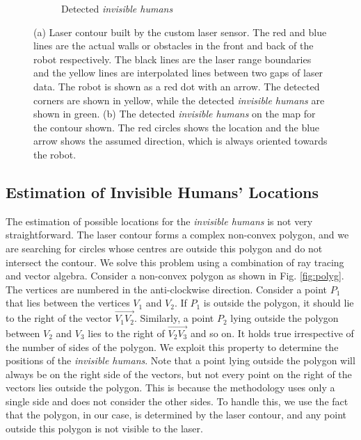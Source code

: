 \begin{figure}[h!]
\begin{subfigure}[t]{0.45\columnwidth}
  \caption{Detected \textit{invisible humans}}
\end{subfigure}
    \caption{(a) Laser contour built by the custom laser sensor. The red and blue lines are the actual walls or obstacles in the front and back of the robot respectively. The black lines are the laser range boundaries and the yellow lines are interpolated lines between two gaps of laser data. The robot is shown as a red dot with an arrow. The detected corners are shown in yellow, while the detected \textit{invisible humans} are shown in green. (b) The detected \textit{invisible humans} on the map for the contour shown. The red circles shows the location and the blue arrow shows the assumed direction, which is always oriented towards the robot.}
    \label{fig:detection}
\end{figure}

\subsection{Estimation of Invisible Humans’ Locations}
The estimation of possible locations for the \textit{invisible humans} is not very straightforward. The laser contour forms a complex non-convex polygon, and we are searching for circles whose centres are outside this polygon and do not intersect the contour. We solve this problem using a combination of ray tracing and vector algebra. Consider a non-convex polygon as shown in Fig. \ref{fig:polyg}. The vertices are numbered in the anti-clockwise direction. Consider a point $P_1$ that lies between the vertices $V_1$ and $V_2$. If $P_1$ is outside the polygon, it should lie to the right of the vector $\overrightarrow{V_1V_2}$. Similarly, a point $P_2$ lying outside the polygon between $V_2$ and $V_3$ lies to the right of $\overrightarrow{V_2V_3}$ and so on. It holds true irrespective of the number of sides of the polygon. We exploit this property to determine the positions of the \textit{invisible humans}. Note that a point lying outside the polygon will always be on the right side of the vectors, but not every point on the right of the vectors lies outside the polygon. This is because the methodology uses only a single side and does not consider the other sides. To handle this, we use the fact that the polygon, in our case, is determined by the laser contour, and any point outside this polygon is not visible to the laser.

